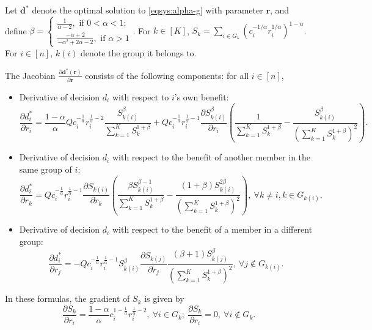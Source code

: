 \documentclass[ijoc,sglanonrev]{informs4}
\begin{document}
\begin{proposition} 
\label{prop:analytical_gradient_group-1}
Let $\mathbf{d}^*$ denote the optimal solution to \eqref{eqsys:alpha-g} with parameter $\mathbf{r}$, and define $\beta = \begin{cases} \frac{1}{\alpha-2}, \text{ if } 0 < \alpha < 1; \\
\frac{-\alpha+2}{-\alpha^2 + 2\alpha-2}, \text{ if } \alpha > 1
\end{cases}$. For $k \in [K]$, $S_k = \sum_{i \in G_k} \left(c_i^{-1/\alpha}r_i^{1/\alpha}\right)^{1-\alpha}$. For $i \in [n]$, $k(i)$ denote the group it belongs to. 

The Jacobian $\frac{\partial \mathbf{d^*(\mathbf{r})}}{\partial \mathbf{r}}$ consists of the following components: for all $i \in [n]$,
\begin{itemize}
    \item  Derivative of decision $d_i$ with respect to $i$'s own benefit:
    \[ \frac{\partial d_i^*}{\partial r_i} = \frac{1-\alpha}{\alpha}Qc_i^{-\frac{1}{\alpha}}r_i^{\frac{1}{\alpha}-2} \frac{S_{k(i)}^{\beta}}{\sum_{k=1}^K S_k^{1+\beta}} + Qc_i^{-\frac{1}{\alpha}}r_i^{\frac{1}{\alpha}-1} \frac{\partial S_{k(i)}^{\beta}}{\partial r_i} \left( \frac{1}{\sum_{k=1}^K S_k^{1+\beta}} - \frac{S_{k(i)}^{\beta}}{(\sum_{k=1}^K S_k^{1+\beta})^2}\right).
    \]
     \item  Derivative of decision $d_i$ with respect to the benefit of another member in the same group of $i$:
     \[\frac{\partial d_i^*}{\partial r_k} = Qc_i^{-\frac{1}{\alpha}}r_i^{\frac{1}{\alpha}-1} \frac{\partial S_{k(i)}}{\partial r_k} \left( \frac{\beta S_{k(i)}^{\beta-1}}{\sum_{k=1}^K S_k^{1+\beta}} - \frac{(1+\beta)S_{k(i)}^{2\beta}}{(\sum_{k=1}^K S_k^{1+\beta})^2}\right), ~\forall k \neq i, k \in G_{k(i)}.\]
     \item Derivative of decision $d_i$ with respect to the benefit of a member in a different group: 
     \[
     \frac{\partial d_i^*}{\partial r_j} = -Qc_i^{-\frac{1}{\alpha}}r_i^{\frac{1}{\alpha}-1}S_{k(i)}^{\beta}\frac{\partial S_{k(j)}}{\partial r_j} \frac{(\beta+1)S_{k(j)}^{\beta}}{(\sum_{k=1}^K S_k^{1+\beta})^2}, ~\forall j \notin G_{k(i)}. 
     \]
\end{itemize}
In these formulas, the gradient of $S_k$ is given by
\[
\frac{\partial S_k}{\partial r_i} = \frac{1-\alpha}{\alpha}c_i^{1-\frac{1}{\alpha}}r_i^{\frac{1}{\alpha}-2}, ~\forall i \in G_k;
~ \frac{\partial S_k}{\partial r_i} = 0, ~\forall i \notin G_k.
\]
\end{proposition}
\end{document}
